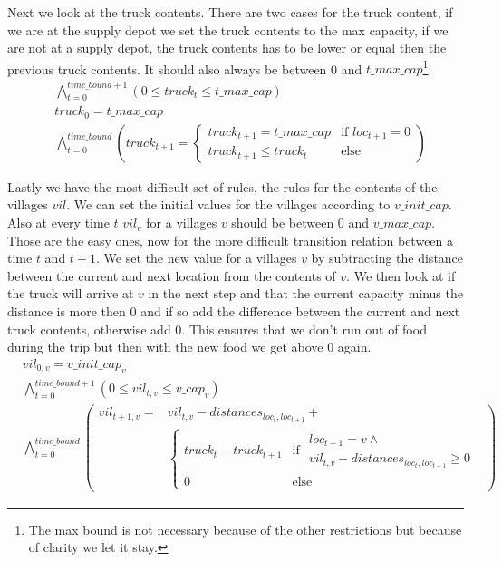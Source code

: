 \documentclass[12pt]{scrartcl}
\begin{document}
Next we look at the truck contents. There are two cases for the truck content, if we are at the supply depot we set the truck contents to the max capacity, if we are not at a supply depot, the truck contents has to be lower or equal then the previous truck contents. It should also always be between 0 and $t\_max\_cap$\footnote{The max bound is not necessary because of the other restrictions but because of clarity we let it stay.}:
\begin{align*}
    &\bigwedge_{t = 0}^{time\_bound + 1} \left(
        0 \leq truck_t \leq t\_max\_cap
    \right) \\
    &truck_0 = t\_max\_cap\\
    &\bigwedge_{t = 0}^{time\_bound} \left(
        truck_{t+1} = \begin{cases}
            truck_{t+1} = t\_max\_cap & \text{if } loc_{t+1} = 0 \\
            truck_{t+1} \leq truck_t & \text{else}
        \end{cases}
    \right)
\end{align*}

Lastly we have the most difficult set of rules, the rules for the contents of the villages $vil$. We can set the initial values for the villages according to $v\_init\_cap$. Also at every time $t$ $vil_v$ for a villages $v$ should be between 0 and $v\_max\_cap$. Those are the easy ones, now for the more difficult transition relation between a time $t$ and $t+1$. We set the new value for a villages $v$ by subtracting the distance between the current and next location from the contents of $v$. We then look at if the truck will arrive at $v$ in the next step and that the current capacity minus the distance is more then 0 and if so add the difference between the current and next truck contents, otherwise add 0. This ensures that we don't run out of food during the trip but then with the new food we get above 0 again.
\begin{align*}
    &vil_{0,v} = v\_init\_cap_v\\
    &\bigwedge_{t = 0}^{time\_bound + 1} \left(0 \leq vil_{t,v} \leq v\_cap_v\right)\\
    &\bigwedge_{t = 0}^{time\_bound} \left(\begin{array}{ll}
        vil_{t+1,v} = &vil_{t,v} - distances_{loc_t, loc_{t+1}} + \\
        &\begin{cases}
            truck_t - truck_{t+1} & \text{if } \begin{array}{l}
                loc_{t+1} = v \wedge\\
                vil_{t,v} - distances_{loc_t, loc_{t+1}} \geq 0
            \end{array}\\
            0 &\text{else}
        \end{cases}
    \end{array}
    \right)
\end{align*}
\end{document}
